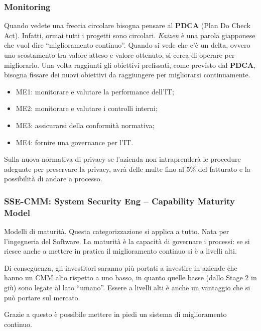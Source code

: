 \subsubsection{Monitoring}
Quando vedete una freccia circolare bisogna pensare al \textbf{PDCA} (Plan Do
Check Act). Infatti, ormai tutti i progetti sono circolari. \emph{Kaizen} è
una parola giapponese che vuol dire “miglioramento continuo”. Quando si vede
che c’è un delta, ovvero uno scostamento tra valore atteso e valore ottenuto,
si cerca di operare per migliorarlo. Una volta raggiunti gli obiettivi
prefissati, come previsto dal \textbf{PDCA}, bisogna fissare dei nuovi
obiettivi da raggiungere per migliorarsi continuamente.

\begin{itemize}
\item ME1: monitorare e valutare la performance dell'IT;
\item ME2: monitorare e valutare i controlli interni;
\item ME3: assicurarsi della conformità normativa;
\item ME4: fornire una governance per l'IT.
\end{itemize}

Sulla nuova normativa di privacy se l'azienda non intraprenderà le procedure
adeguate per preservare la privacy, avrà delle multe fino al 5\% del fatturato
e la possibilità di andare a processo.

\subsubsection{SSE-CMM: System Security Eng -- Capability Maturity Model}

Modelli di maturità. Questa categorizzazione si applica a tutto. Nata per
l'ingegneria del Software.
La maturità è la capacità di governare i processi: se si riesce anche a
mettere in pratica il miglioramento continuo si è a livelli alti.

Di conseguenza, gli investitori saranno più portati a investire in aziende che
hanno un CMM alto rispetto a uno basso, in quanto quelle basse (dallo Stage 2
in giù) sono legate al lato ``umano''. Essere a livelli alti è anche un
vantaggio che si può portare sul mercato.

Grazie a questo è possibile mettere in piedi un sistema di miglioramento
continuo.

